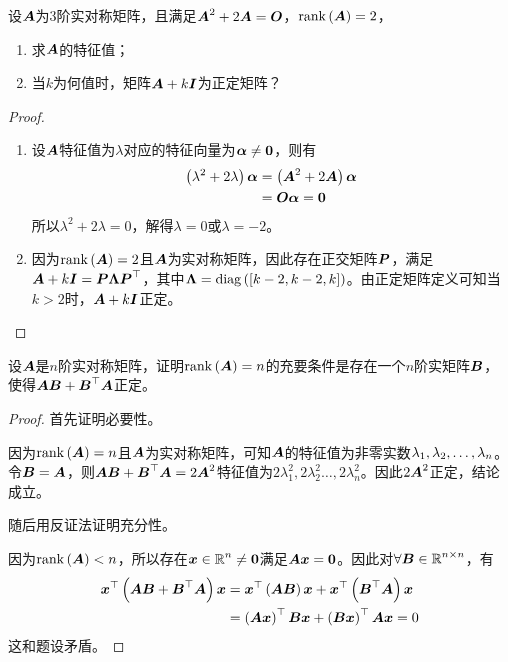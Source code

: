 \begin{problem}
设\(\mata\)为\(3\)阶实对称矩阵，且满足\(\mata^2+2\mata=\mato\)，\(\rank{\mata}=2\)，
\begin{enumerate}
    \item 求\(\mata\)的特征值；
    \item 当\(k\)为何值时，矩阵\(\mata+k\mati\)为正定矩阵？
\end{enumerate}
\end{problem}
\begin{proof}
    \begin{enumerate}
        \item {
              设\(\mata\)特征值为\(\lambda\)对应的特征向量为\(\vecal\neq\veczero\)，则有
              \begin{align*}
                  \spar{\lambda^2+2\lambda}\vecal & =\spar{\mata^2+2\mata}\vecal \\
                                                  & =\mato\vecal=\veczero
              \end{align*}
              所以\(\lambda^2+2\lambda=0\)，解得\(\lambda=0\)或\(\lambda=-2\)。
              }
        \item {
              因为\(\rank{\mata}=2\)且\(\mata\)为实对称矩阵，因此存在正交矩阵\(\matp\)，满足\(\mata+k\mati=\matp\matlam\matp^\top\)，其中\(\matlam=\diag{\mat{k-2,k-2,k}}\)。由正定矩阵定义可知当\(k>2\)时，\(\mata+k\mati\)正定。
              }
    \end{enumerate}
\end{proof}

\begin{problem}
设\(\mata\)是\(n\)阶实对称矩阵，证明\(\rank{\mata}=n\)的充要条件是存在一个\(n\)阶实矩阵\(\matb\)，使得\(\mata\matb+\matb^\top\mata\)正定。
\end{problem}
\begin{proof}
    首先证明必要性。

    因为\(\rank{\mata}=n\)且\(\mata\)为实对称矩阵，可知\(\mata\)的特征值为非零实数\(\enums{\lambda}{n}\)。令\(\matb=\mata\)，则\(\mata\matb+\matb^\top\mata=2\mata^2\)特征值为\(2\lambda_1^2,2\lambda_2^2\dots,2\lambda_n^2\)。因此\(2\mata^2\)正定，结论成立。

    随后用反证法证明充分性。

    因为\(\rank{\mata}<n\)，所以存在\(\vecx\in\rea^n\neq\veczero\)满足\(\mata\vecx=\veczero\)。因此对\(\forall\matb\in\rea^{n\times n}\)，有
    \begin{align*}
        \vecx^\top\spar{\mata\matb+\matb^\top\mata}\vecx & =\vecx^\top\spar{\mata\matb}\vecx+\vecx^\top\spar{\matb^\top\mata}\vecx \\
                                                         & =\spar{\mata\vecx}^\top\matb\vecx+\spar{\matb\vecx}^\top\mata\vecx=0
    \end{align*}
    这和题设矛盾。
\end{proof}

